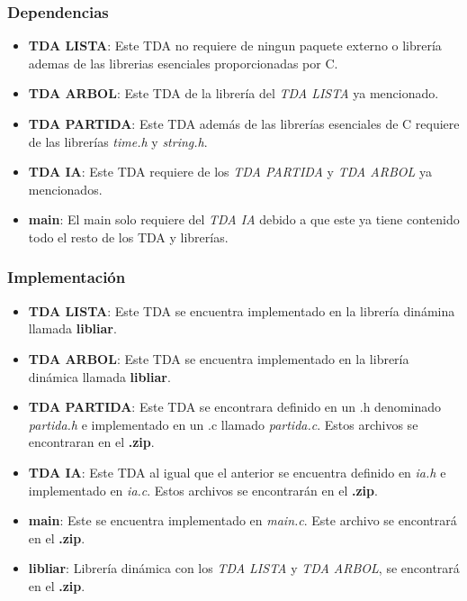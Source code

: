 \documentclass[12pt,a4paper]{article}
\begin{document}
\subsubsection{Dependencias}
\begin{itemize}
    \item {\bf TDA LISTA}: Este TDA no requiere de ningun paquete externo o librer\'ia ademas de las librerias esenciales proporcionadas por C.
    \item {\bf TDA ARBOL}: Este TDA de la librer\'ia del {\itshape TDA LISTA} ya mencionado.
    \item {\bf TDA PARTIDA}: Este TDA adem\'as de las librer\'ias esenciales de C requiere de las  librer\'ias {\itshape time.h} y {\itshape string.h}.
    \item {\bf TDA IA}: Este TDA requiere de los {\itshape TDA PARTIDA} y {\itshape TDA ARBOL} ya mencionados.
    \item {\bf main}: El main solo requiere del {\itshape TDA IA} debido a que este ya tiene contenido todo el resto de los TDA y librer\'ias.
\end{itemize}

\subsubsection{Implementaci\'on}
\begin{itemize}
    \item {\bf TDA LISTA}: Este TDA se encuentra implementado en la librer\'ia din\'amina llamada {\bf libliar}.
    \item {\bf TDA ARBOL}: Este TDA se encuentra implementado en la librer\'ia din\'amica llamada {\bf libliar}.
    \item {\bf TDA PARTIDA}: Este TDA se encontrara definido en un .h denominado {\itshape partida.h} e implementado en un .c llamado {\itshape partida.c}. Estos archivos se encontraran en el {\bf .zip}.
    \item {\bf TDA IA}: Este TDA al igual que el anterior se encuentra definido en {\itshape ia.h} e implementado en {\itshape ia.c}. Estos archivos se encontrar\'an en el {\bf .zip}.
    \item {\bf main}: Este se encuentra implementado en {\itshape main.c}. Este archivo se encontrar\'a en el {\bf .zip}.
    \item {\bf libliar}: Librer\'ia din\'amica con los {\itshape TDA LISTA} y {\itshape TDA ARBOL}, se encontrar\'a en el {\bf .zip}.
\end{itemize}
\end{document}
